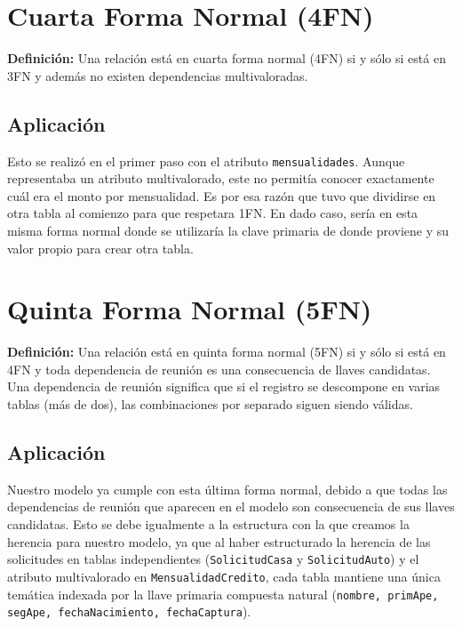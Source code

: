 \documentclass[12pt, a4paper]{article}
\begin{document}
\vspace{0.3cm}
\noindent
{}

\section{Cuarta Forma Normal (4FN)}

\textbf{Definición:} Una relación está en cuarta forma normal (4FN) si y sólo si está en 3FN y además no existen dependencias multivaloradas.

\subsection*{Aplicación}

Esto se realizó en el primer paso con el atributo \texttt{mensualidades}. Aunque representaba un atributo multivalorado, este no permitía conocer exactamente cuál era el monto por mensualidad. Es por esa razón que tuvo que dividirse en otra tabla al comienzo para que respetara 1FN. En dado caso, sería en esta misma forma normal donde se utilizaría la clave primaria de donde proviene y su valor propio para crear otra tabla.

\vspace{0.3cm}
\noindent
{}

\section{Quinta Forma Normal (5FN)}

\textbf{Definición:} Una relación está en quinta forma normal (5FN) si y sólo si está en 4FN y toda dependencia de reunión es una consecuencia de llaves candidatas. Una dependencia de reunión significa que si el registro se descompone en varias tablas (más de dos), las combinaciones por separado siguen siendo válidas.

\subsection*{Aplicación}

Nuestro modelo ya cumple con esta última forma normal, debido a que todas las dependencias de reunión que aparecen en el modelo son consecuencia de sus llaves candidatas. Esto se debe igualmente a la estructura con la que creamos la herencia para nuestro modelo, ya que al haber estructurado la herencia de las solicitudes en tablas independientes (\texttt{SolicitudCasa} y \texttt{SolicitudAuto}) y el atributo multivalorado en \texttt{MensualidadCredito}, cada tabla mantiene una única temática indexada por la llave primaria compuesta natural (\texttt{nombre, primApe, segApe, fechaNacimiento, fechaCaptura}).
\end{document}
